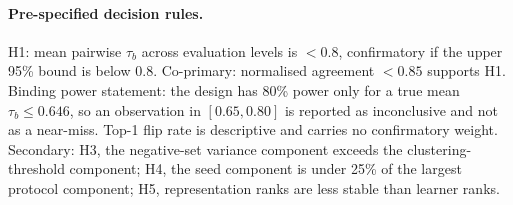 \documentclass[11pt,a4paper]{article}
\begin{document}
\paragraph{Pre-specified decision rules.} H1: mean pairwise $\tau_b$ across evaluation
levels is $<0.8$, confirmatory if the upper 95\% bound is below $0.8$. Co-primary:
normalised agreement $<0.85$ supports H1. Binding power statement: the design has 80\%
power only for a true mean $\tau_b \leq 0.646$, so an observation in $[0.65, 0.80]$ is
reported as inconclusive and not as a near-miss. Top-1 flip rate is descriptive and carries
no confirmatory weight. Secondary: H3, the negative-set variance component exceeds the
clustering-threshold component; H4, the seed component is under 25\% of the largest
protocol component; H5, representation ranks are less stable than learner ranks.
\end{document}
